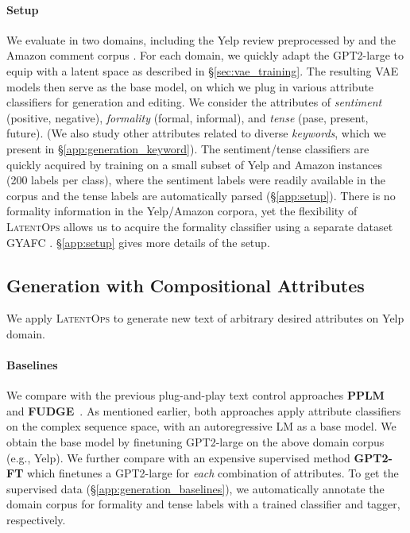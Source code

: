 \documentclass[11pt]{article}
\begin{document}
\paragraph{Setup}
We evaluate in two domains, including the Yelp review  \cite{DBLP:conf/nips/ShenLBJ17} preprocessed by \citet{DBLP:conf/naacl/LiJHL18} and the Amazon comment corpus \cite{DBLP:conf/www/HeM16}. 
For each domain, we quickly adapt the GPT2-large to equip with a latent space as described in \S\ref{sec:vae_training}. 
The resulting VAE models then serve as the base model, on which we plug in various attribute classifiers for generation and editing. 
We consider the attributes of \emph{sentiment} (positive, negative), \emph{formality} (formal, informal), and \emph{tense} (pase, present, future). 
(We also study other attributes related to diverse \emph{keywords}, which we present in \S\ref{app:generation_keyword}).
The sentiment/tense classifiers are quickly acquired by training on a small subset of Yelp and Amazon instances (200 labels per class), where the sentiment labels were readily available in the corpus and the tense labels are automatically parsed (\S\ref{app:setup}). 
There is no formality information in the Yelp/Amazon corpora, yet the flexibility of \textsc{LatentOps} allows us to acquire the formality classifier using a separate dataset GYAFC \cite{DBLP:conf/naacl/RaoT18}. 
\S\ref{app:setup} gives more details of the setup.

\subsection{Generation with Compositional Attributes}
\label{sec:cg_exp}

We apply \textsc{LatentOps} to generate new text of arbitrary desired attributes on Yelp domain.










\paragraph{Baselines}
We compare with the previous plug-and-play text control approaches {\bf PPLM}~\cite{Dathathri2020Plug} and {\bf FUDGE}~\cite{DBLP:journals/corr/abs-2104-05218}. 
As mentioned earlier, both approaches apply attribute classifiers on the complex sequence space, with an autoregressive LM as a base model. 
We obtain the base model by finetuning GPT2-large on the above domain corpus (e.g., Yelp). We further compare with an expensive supervised method {\bf GPT2-FT} which finetunes a GPT2-large for \emph{each} combination of attributes. 
To get the supervised data (\S\ref{app:generation_baselines}), we automatically annotate the domain corpus for formality and tense labels with a trained classifier and tagger, respectively. 
\end{document}
